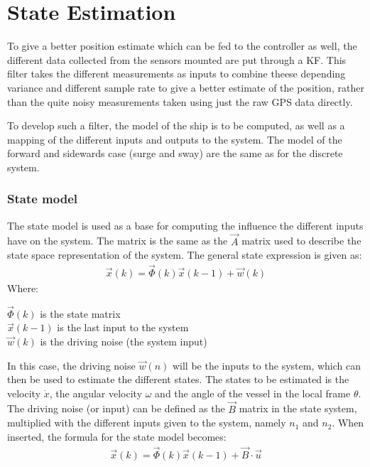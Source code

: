 \chapter{State Estimation}
To give a better position estimate which can be fed to the controller as well, the different data collected from the sensors mounted are put through a \ac{KF}. This filter takes the different measurements as inputs to combine theese depending variance and different sample rate to give a better estimate of the position, rather than the quite noisy measurements taken using just the raw \ac{GPS} data directly.

To develop such a filter, the model of the ship is to be computed, as well as a mapping of the different inputs and outputs to the system. The model of the forward and sidewards case (surge and sway) are the same as for the discrete system. 

\subsection{State model}
The state model is used as a base for computing the influence the different inputs have on the system. The matrix is the same as the $\vec{A}$ matrix used to describe the state space representation of the system. The general state expression is given as:
\begin{align}
\vec{x}(k) = \vec{\Phi}(k)\vec{x}(k-1) + \vec{w}(k)
\end{align}
\noindent Where:
\begin{ffk}
$\vec{\Phi}(k)$ is the state matrix\\
$\vec{x}(k-1)$ is the last input to the system\\
$\vec{w}(k)$ is the driving noise (the system input)
\end{ffk}
In this case, the driving noise $\vec{w}(n)$ will be the inputs to the system, which can then be used to estimate the different states. The states to be estimated is the velocity $\dot{x}$, the angular velocity $\omega$ and the angle of the vessel in the local frame $\theta$. The driving noise (or input) can be defined as the $\vec{B}$ matrix in the state system, multiplied with the different inputs given to the system, namely $n_1$ and $n_2$. When inserted, the formula for the state model becomes:
\begin{align}
\vec{x}(k) = \vec{\Phi}(k)\vec{x}(k-1) + \vec{B}\cdot\vec{u}
\end{align}

